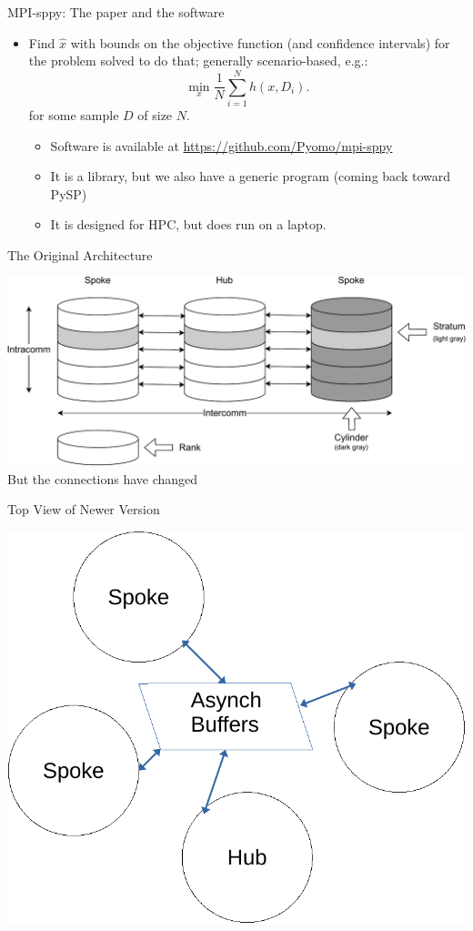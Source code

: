 \documentclass[9pt,usenames,dvipsnames]{beamer}
\begin{document}
\begin{frame}{MPI-sppy: The paper and the software}
\begin{itemize}
\item Find $\hat{x}$ with bounds on the objective function (and confidence intervals) for the problem solved to do that; generally scenario-based, e.g.:
  $$
   \min_x \frac{1}{N} \sum_{i=1}^N h(x, D_i).
   $$
   for some sample $D$ of size $N$.
  \begin{itemize}
  \item Software is available at \url{https://github.com/Pyomo/mpi-sppy}
  \item It is a library, but we also have a generic program (coming back toward PySP)
    \item It is designed for HPC, but does run on a laptop.
    \end{itemize}
\end{itemize}
\end{frame}

\begin{frame}{The Original Architecture}
  \subtitle{MPI: Message Passing Interface}

\includegraphics[width=1.0\linewidth]{hubspoke.pdf}
But the connections have changed
\end{frame}


\begin{frame}{Top View of Newer Version}

\includegraphics[width=1.0\linewidth]{topview.pdf}

\end{frame}
\end{document}
